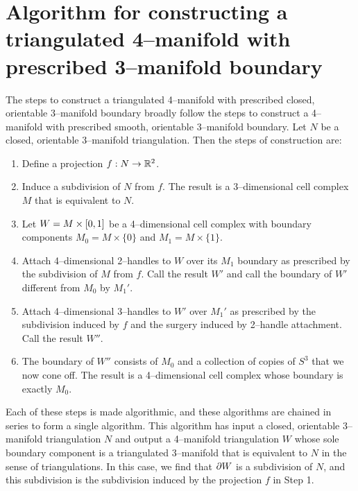 \chapter[Triangulated]{Algorithm for constructing a triangulated 4--manifold with prescribed 3--manifold boundary}
\label{chapter:triangulation}

The steps to construct a triangulated 4--manifold with prescribed closed, orientable 3--manifold boundary broadly follow the steps to construct a 4--manifold with prescribed smooth, orientable 3--manifold boundary.
Let $N$ be a closed, orientable 3--manifold triangulation.
Then the steps of construction are:
\begin{enumerate}
	\item Define a projection $f:N\to\mathbb{R}^2$.
	
	\item Induce a subdivision of $N$ from $f$.  The result is a 3--dimensional cell complex $M$ that is equivalent to $N$.

	\item Let $W=M\times[0,1]$ be a 4--dimensional cell complex with boundary components $M_0 = M\times\{0\}$ and $M_1 = M\times\{1\}$.
	
	\item Attach 4--dimensional 2--handles to $W$ over its $M_1$ boundary as prescribed by the subdivision of $M$ from $f$.  Call the result $W'$ and call the boundary of $W'$ different from $M_0$ by $M_1'$.
	
	\item Attach 4--dimensional 3--handles to $W'$ over $M_1'$ as prescribed by the subdivision induced by $f$ and the surgery induced by 2--handle attachment.  Call the result $W''$.
	
	\item The boundary of $W''$ consists of $M_0$ and a collection of copies of $S^3$ that we now cone off.  The result is a 4--dimensional cell complex whose boundary is exactly $M_0$.
\end{enumerate}

Each of these steps is made algorithmic, and these algorithms are chained in series to form a single algorithm.
This algorithm has input a closed, orientable 3--manifold triangulation $N$ and output a 4--manifold triangulation $W$ whose sole boundary component is a triangulated 3--manifold that is equivalent to $N$ in the sense of triangulations.
In this case, we find that $\partial W$ is a subdivision of $N$, and this subdivision is the subdivision induced by the projection $f$ in Step 1.

